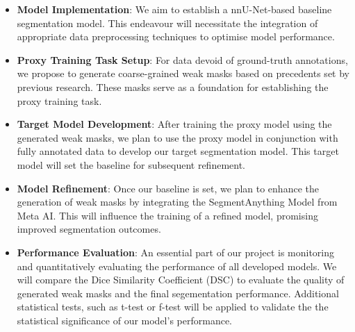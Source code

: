 \begin{itemize}
\item \textbf{Model Implementation}: We aim to establish a nnU-Net-based baseline segmentation model. This endeavour will necessitate the integration of appropriate data preprocessing techniques to optimise model performance.

\item \textbf{Proxy Training Task Setup}: For data devoid of ground-truth annotations, we propose to generate coarse-grained weak masks based on precedents set by previous research. These masks serve as a foundation for establishing the proxy training task.

\item \textbf{Target Model Development}: After training the proxy model using the generated weak masks, we plan to use the proxy model in conjunction with fully annotated data to develop our target segmentation model. This target model will set the baseline for subsequent refinement.

\item \textbf{Model Refinement}: Once our baseline is set, we plan to enhance the generation of weak masks by integrating the SegmentAnything Model \cite{kirillov2023segany} from Meta AI. This will influence the training of a refined model, promising improved segmentation outcomes.

\item \textbf{Performance Evaluation}: An essential part of our project is monitoring and quantitatively evaluating the performance of all developed models. We will compare the Dice Similarity Coefficient (DSC) to evaluate the quality of generated weak masks and the final segementation performance. Additional statistical tests, such as t-test or f-test will be applied to validate the the statistical significance of our model's performance. 
\end{itemize}